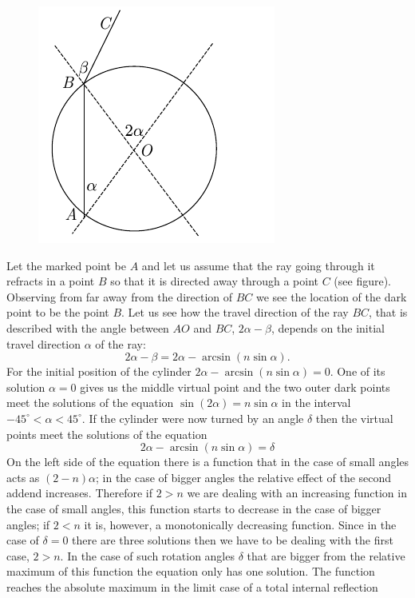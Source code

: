 \documentclass[11pt]{article}
\begin{document}
{

\ifEngSolution
\begin{figure}%
\includegraphics[trim = 0mm 0mm 12mm 0mm, clip, width=1\linewidth]{2014-v3g-10-silinder}
\end{figure}
Let the marked point be $A$ and let us assume that the ray going through it refracts in a point $B$ so that it is directed away through a point $C$ (see figure). Observing from far away from the direction of $BC$ we see the location of the dark point to be the point $B$. Let us see how the travel direction of the ray $BC$, that is described with the angle between $AO$ and $BC$, $2\alpha-\beta$, depends on the initial travel direction $\alpha$ of the ray:
$$2\alpha-\beta= 2\alpha-\arcsin (n\sin\alpha).$$
For the initial position of the cylinder $2\alpha-\arcsin (n\sin\alpha) =0$. One of its solution $\alpha=0$ gives us the middle virtual point and the two outer dark points meet the solutions of the equation $\sin(2\alpha)=n\sin\alpha$ in the interval $-45^\circ <\alpha<45^\circ$. If the cylinder were now turned by an angle $\delta$ then the virtual points meet the solutions of the equation
$$2\alpha-\arcsin (n\sin\alpha) =\delta$$
On the left side of the equation there is a function that in the case of small angles acts as $(2-n)\alpha$; in the case of bigger angles the relative effect of the second addend increases. Therefore if $2>n$ we are dealing with an increasing function in the case of small angles, this function starts to decrease in the case of bigger angles; if $2<n$ it is, however, a monotonically decreasing function. Since in the case of $\delta=0$ there are three solutions then we have to be dealing with the first case, $2>n$. In the case of such rotation angles $\delta$ that are bigger from the relative maximum of this function the equation only has one solution. The function reaches the absolute maximum in the limit case of a total internal reflection
}
\end{document}

